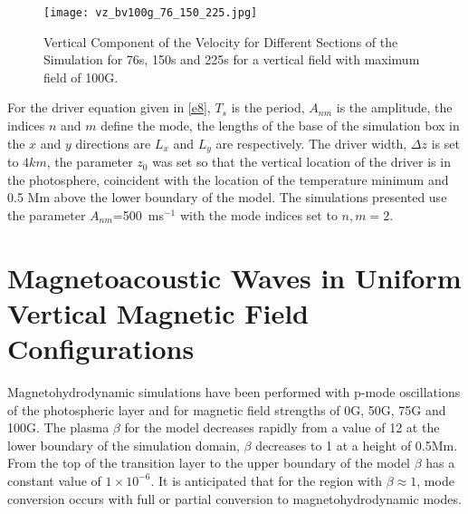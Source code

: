 \documentclass[linenumbers]{aastex63}
\begin{document}
\begin{figure}\label{vzplot_bv100g_76_150_225}
\texttt{[image: vz\_bv100g\_76\_150\_225.jpg]}
\caption{Vertical Component of the Velocity for Different Sections of the Simulation for 76s, 150s and 225s for a vertical field with maximum field of 100G.}
\end{figure}



 

For the driver equation given in \ref{e8}, $T_{s}$ is the period, $A_{nm}$ is the amplitude, the indices $n$ and $m$ define the mode, the lengths of the base of the simulation box in the $x$ and $y$ directions are $L_{x}$ and $L_{y}$ are  respectively. The driver width, $\Delta z$ is set to $4km$, the parameter $z_{0}$ was set so that the vertical location of the driver is in the photosphere, coincident with the location of the temperature minimum and 0.5 Mm above the lower boundary of the model. The simulations presented use the parameter $A_{nm}$=500\, ms$^{-1}$ with the mode indices set to $n,m=2$. 





\section{Magnetoacoustic Waves in Uniform Vertical Magnetic Field Configurations}
Magnetohydrodynamic simulations have been performed with p-mode oscillations of the photospheric layer and for magnetic field strengths of 0G, 50G, 75G and 100G. The plasma $\beta$ for the model decreases rapidly from a value of 12 at the lower boundary of the simulation domain, $\beta$ decreases to 1 at a height of 0.5Mm.  From the top of the transition layer to the upper boundary of the model $\beta $ has a constant value of $1\times 10^{-6}$. It is anticipated that for the region with $\beta \approx 1$, mode conversion occurs with full or partial conversion to magnetohydrodynamic modes. 
\end{document}
